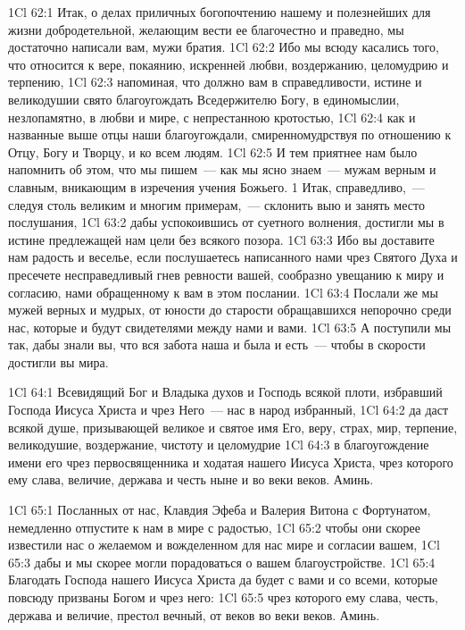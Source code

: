 \vs 1Cl 62:1
Итак, о делах приличных
богопочтению нашему и полезнейших для жизни добродетельной, желающим вести ее
благочестно и праведно, мы достаточно написали вам, мужи братия.
\vs 1Cl 62:2
Ибо мы всюду касались
того, что относится к вере, покаянию, искренней любви, воздержанию,
целомудрию и терпению,
\vs 1Cl 62:3
напоминая, что должно вам
в справедливости, истине и великодушии свято благоугождать Вседержителю Богу,
в единомыслии, незлопамятно, в любви и мире, с непрестанною кротостью,
\vs 1Cl 62:4
как и названные выше отцы
наши благоугождали, смиренномудрствуя по отношению к Отцу, Богу и Творцу, и ко
всем людям.
\vs 1Cl 62:5
И тем приятнее нам было
напомнить об этом, что мы пишем~--- как мы ясно знаем~--- мужам верным и славным,
вникающим в изречения учения Божьего.
1
Итак, справедливо,~--- следуя столь великим и многим примерам,~--- склонить выю и
занять место послушания,
\vs 1Cl 63:2
дабы успокоившись от
суетного волнения, достигли мы в истине предлежащей нам цели без всякого
позора.
\vs 1Cl 63:3
Ибо вы доставите нам
радость и веселье, если послушаетесь написанного нами чрез Святого Духа и
пресечете несправедливый гнев ревности вашей, сообразно увещанию к миру и
согласию, нами обращенному к вам в этом послании.
\vs 1Cl 63:4
Послали же мы мужей верных
и мудрых, от юности до старости обращавшихся непорочно среди нас, которые и
будут свидетелями между нами и вами.
\vs 1Cl 63:5
А поступили мы так, дабы
знали вы, что вся забота наша и была и есть~--- чтобы в скорости достигли вы
мира.

\vs 1Cl 64:1
Всевидящий Бог и Владыка
духов и Господь всякой плоти, избравший Господа Иисуса Христа и чрез Него~---
нас в народ избранный,
\vs 1Cl 64:2
да даст всякой душе,
призывающей великое и святое имя Его, веру, страх, мир, терпение, великодушие,
воздержание, чистоту и целомудрие
\vs 1Cl 64:3
в благоугождение имени его чрез первосвященника и ходатая
нашего Иисуса Христа, чрез которого ему слава,
величие, держава и честь ныне и во веки веков.
Аминь.

\vs 1Cl 65:1
Посланных от нас, Клавдия Эфеба и Валерия Витона с Фортунатом,
немедленно отпустите к нам в мире с радостью,
\vs 1Cl 65:2
чтобы они скорее известили нас о желаемом
и вожделенном для нас мире и согласии вашем,
\vs 1Cl 65:3
дабы и мы скорее могли порадоваться о вашем благоустройстве.
\vs 1Cl 65:4
Благодать Господа нашего Иисуса Христа да будет
с вами и со всеми, которые повсюду призваны Богом и чрез него:
\vs 1Cl 65:5
чрез которого ему слава,
честь, держава и величие, престол вечный,
от веков во веки веков. Аминь.
